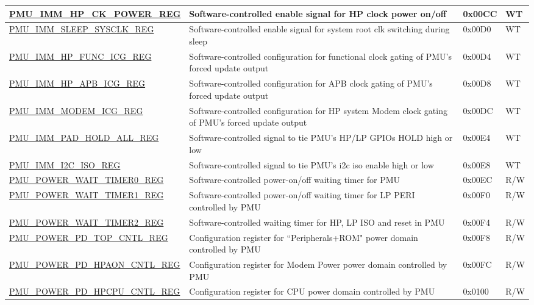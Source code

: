 \begin{longtable}{ | l | p{6cm} | p{1.3cm} | p{1.5cm} | }
\hyperref[regdesc:PMUIMMHPCKPOWERREG]{PMU\_IMM\_HP\_CK\_POWER\_REG} & Software-controlled enable signal for HP clock power on/off & 0x00CC & WT \\ \hline
\hyperref[regdesc:PMUIMMSLEEPSYSCLKREG]{PMU\_IMM\_SLEEP\_SYSCLK\_REG} & Software-controlled enable signal for system root clk switching during sleep & 0x00D0 & WT \\ \hline
\hyperref[regdesc:PMUIMMHPFUNCICGREG]{PMU\_IMM\_HP\_FUNC\_ICG\_REG} & Software-controlled configuration for functional clock gating of PMU's forced update output & 0x00D4 & WT \\ \hline
\hyperref[regdesc:PMUIMMHPAPBICGREG]{PMU\_IMM\_HP\_APB\_ICG\_REG} & Software-controlled configuration for APB clock gating of PMU's forced update output & 0x00D8 & WT \\ \hline
\hyperref[regdesc:PMUIMMMODEMICGREG]{PMU\_IMM\_MODEM\_ICG\_REG} & Software-controlled configuration for HP system Modem clock gating of PMU's forced update output & 0x00DC & WT \\ \hline
\hyperref[regdesc:PMUIMMPADHOLDALLREG]{PMU\_IMM\_PAD\_HOLD\_ALL\_REG} & Software-controlled signal to tie PMU's HP/LP GPIOs HOLD high or low & 0x00E4 & WT \\ \hline
\hyperref[regdesc:PMUIMMI2CISOREG]{PMU\_IMM\_I2C\_ISO\_REG} & Software-controlled signal to tie PMU's i2c iso enable high or low & 0x00E8 & WT \\ \hline
\hyperref[regdesc:PMUPOWERWAITTIMER0REG]{PMU\_POWER\_WAIT\_TIMER0\_REG} & Software-controlled power-on/off waiting timer for PMU & 0x00EC & R/W \\ \hline
\hyperref[regdesc:PMUPOWERWAITTIMER1REG]{PMU\_POWER\_WAIT\_TIMER1\_REG} & Software-controlled power-on/off waiting timer for LP PERI controlled by PMU & 0x00F0 & R/W \\ \hline
\hyperref[regdesc:PMUPOWERWAITTIMER2REG]{PMU\_POWER\_WAIT\_TIMER2\_REG} & Software-controlled waiting timer for HP, LP ISO and reset in PMU & 0x00F4 & R/W \\ \hline
\hyperref[regdesc:PMUPOWERPDTOPCNTLREG]{PMU\_POWER\_PD\_TOP\_CNTL\_REG} & Configuration register for ``Peripherals+ROM" power domain controlled by PMU & 0x00F8 & R/W \\ \hline
\hyperref[regdesc:PMUPOWERPDHPAONCNTLREG]{PMU\_POWER\_PD\_HPAON\_CNTL\_REG} & Configuration register for Modem Power power domain controlled by PMU & 0x00FC & R/W \\ \hline
\hyperref[regdesc:PMUPOWERPDHPCPUCNTLREG]{PMU\_POWER\_PD\_HPCPU\_CNTL\_REG} & Configuration register for CPU power domain controlled by PMU & 0x0100 & R/W \\ \hline

\end{longtable}
